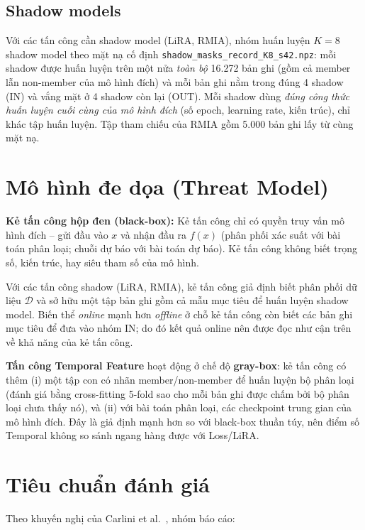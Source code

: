\documentclass[12pt,a4paper]{report}
\begin{document}
\subsection{Shadow models}

Với các tấn công cần shadow model (LiRA, RMIA), nhóm huấn luyện $K = 8$ shadow model theo mặt nạ cố định \texttt{shadow\_masks\_record\_K8\_s42.npz}: mỗi shadow được huấn luyện trên một nửa \textit{toàn bộ} 16.272 bản ghi (gồm cả member lẫn non-member của mô hình đích) và mỗi bản ghi nằm trong đúng 4 shadow (IN) và vắng mặt ở 4 shadow còn lại (OUT). Mỗi shadow dùng \textit{đúng công thức huấn luyện cuối cùng của mô hình đích} (số epoch, learning rate, kiến trúc), chỉ khác tập huấn luyện. Tập tham chiếu của RMIA gồm 5.000 bản ghi lấy từ cùng mặt nạ.

\section{Mô hình đe dọa (Threat Model)}

\textbf{Kẻ tấn công hộp đen (black-box):} Kẻ tấn công chỉ có quyền truy vấn mô hình đích -- gửi đầu vào $x$ và nhận đầu ra $f(x)$ (phân phối xác suất với bài toán phân loại; chuỗi dự báo với bài toán dự báo). Kẻ tấn công không biết trọng số, kiến trúc, hay siêu tham số của mô hình.

Với các tấn công shadow (LiRA, RMIA), kẻ tấn công giả định biết phân phối dữ liệu $\mathcal{D}$ và sở hữu một tập bản ghi gồm cả mẫu mục tiêu để huấn luyện shadow model. Biến thể \textit{online} mạnh hơn \textit{offline} ở chỗ kẻ tấn công còn biết các bản ghi mục tiêu để đưa vào nhóm IN; do đó kết quả online nên được đọc như cận trên về khả năng của kẻ tấn công.

\textbf{Tấn công Temporal Feature} hoạt động ở chế độ \textbf{gray-box}: kẻ tấn công có thêm (i) một tập con có nhãn member/non-member để huấn luyện bộ phân loại (đánh giá bằng cross-fitting 5-fold sao cho mỗi bản ghi được chấm bởi bộ phân loại chưa thấy nó), và (ii) với bài toán phân loại, các checkpoint trung gian của mô hình đích. Đây là giả định mạnh hơn so với black-box thuần túy, nên điểm số Temporal không so sánh ngang hàng được với Loss/LiRA.

\section{Tiêu chuẩn đánh giá}

Theo khuyến nghị của Carlini et al.\ \cite{carlini2022}, nhóm báo cáo:
\end{document}
